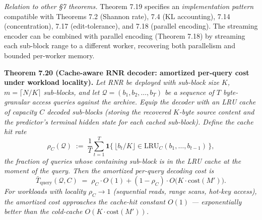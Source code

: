 \documentclass[
]{article}
\begin{document}
\emph{Relation to other §7 theorems.} Theorem 7.19 specifies an
\emph{implementation pattern} compatible with Theorems 7.2 (Shannon
rate), 7.4 (KL accounting), 7.14 (concentration), 7.17 (edit-tolerance),
and 7.18 (parallel encoding). The streaming encoder can be combined
with parallel encoding (Theorem 7.18) by streaming each sub-block
range to a different worker, recovering both parallelism and bounded
per-worker memory.

\textbf{Theorem 7.20 (Cache-aware RNR decoder: amortized per-query
cost under workload locality).}
\emph{Let RNR be deployed with sub-block size $K$, $m = \lceil N/K
\rceil$ sub-blocks, and let $\mathcal{Q} = (b_1, b_2, \ldots, b_T)$
be a sequence of $T$ byte-granular access queries against the archive.
Equip the decoder with an LRU cache of capacity $C$ \emph{decoded
sub-blocks} (storing the recovered $K$-byte source content and the
predictor's terminal hidden state for each cached sub-block). Define
the \emph{cache hit rate}}
\[
\rho_C(\mathcal{Q})
\;:=\;
\frac{1}{T} \sum_{t=1}^{T} \mathbf{1}\{\,\lfloor b_t/K \rfloor \in \mathrm{LRU}_{C}(b_1, \ldots, b_{t-1})\,\},
\]
\emph{the fraction of queries whose containing sub-block is in the LRU
cache at the moment of the query. Then the amortized per-query
decoding cost is}
\[
\boxed{
\;
\bar{T}_{\mathrm{query}}(\mathcal{Q}, C)
\;=\;
\rho_C \cdot O(1) + (1 - \rho_C) \cdot O\bigl(K \cdot \mathrm{cost}(M')\bigr).
\;
}
\]
\emph{For workloads with locality $\rho_C \to 1$ (sequential reads,
range scans, hot-key access), the amortized cost approaches the
cache-hit constant $O(1)$ — exponentially better than the cold-cache
$O(K \cdot \mathrm{cost}(M'))$.}
\end{document}
